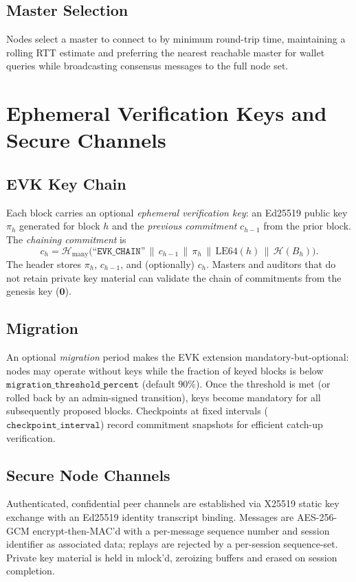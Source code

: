\documentclass[11pt,a4paper]{article}
\theoremstyle{definition}
\newcommand{\hash}{\mathcal{H}}
\newcommand{\emptyroot}{\mathbf{0}}
\begin{document}
\subsection{Master Selection}

Nodes select a master to connect to by minimum round-trip time, maintaining a
rolling RTT estimate and preferring the nearest reachable master for wallet
queries while broadcasting consensus messages to the full node set.

\section{Ephemeral Verification Keys and Secure Channels}
\label{sec:evk}

\subsection{EVK Key Chain}

Each block carries an optional \emph{ephemeral verification key}: an Ed25519
public key $\pi_h$ generated for block $h$ and the \emph{previous commitment}
$c_{h-1}$ from the prior block.  The \emph{chaining commitment} is
\[
c_h = \hash_{\mathrm{many}}\bigl(
  \texttt{``EVK\_CHAIN''}\,\|\,c_{h-1}\,\|\,\pi_h\,\|\,\mathrm{LE64}(h)\,\|\,\hash(B_h)
\bigr).
\]
The header stores $\pi_h$, $c_{h-1}$, and (optionally) $c_h$.  Masters and
auditors that do not retain private key material can validate the chain of
commitments from the genesis key ($\emptyroot$).

\subsection{Migration}

An optional \emph{migration} period makes the EVK extension mandatory-but-optional:
nodes may operate without keys while the fraction of keyed blocks is below
$\texttt{migration\_threshold\_percent}$ (default $90\%$).  Once the threshold
is met (or rolled back by an admin-signed transition), keys become mandatory for
all subsequently proposed blocks.  Checkpoints at fixed intervals
($\texttt{checkpoint\_interval}$) record commitment snapshots for efficient
catch-up verification.

\subsection{Secure Node Channels}

Authenticated, confidential peer channels are established via X25519 static key
exchange with an Ed25519 identity transcript binding.  Messages are AES-256-GCM
encrypt-then-MAC'd with a per-message sequence number and session identifier as
associated data; replays are rejected by a per-session sequence-set.  Private key
material is held in mlock'd, zeroizing buffers and erased on session completion.
\end{document}

